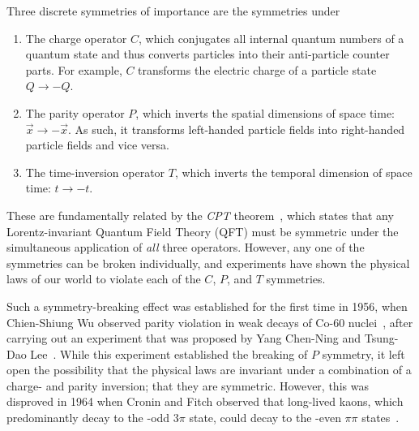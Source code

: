 Three discrete symmetries of importance are the symmetries under 
\begin{enumerate}
    \item The charge operator $C$, which conjugates all internal quantum numbers of a quantum state and thus converts particles into their anti-particle counter parts. For example, $C$ transforms the electric charge of a particle state $Q\to-Q$.
    \item The parity operator $P$, which inverts the spatial dimensions of space time: $\vec x \to -\vec x$. As such, it transforms left-handed particle fields into right-handed particle fields and vice versa.
    \item The time-inversion operator $T$, which inverts the temporal dimension of space time: $t\to -t$.
\end{enumerate}
These are fundamentally related by the \emph{CPT} theorem~\cite{ludersEquivalenceInvarianceTime1954}, which states that any Lorentz-invariant Quantum Field Theory (QFT) must be symmetric under the simultaneous application of \emph{all} three operators. However, any one of the symmetries can be broken individually, and experiments have shown the physical laws of our world to violate each of the $C$, $P$, and $T$ symmetries. 

Such a symmetry-breaking effect was established for the first time in 1956, when Chien-Shiung Wu observed parity violation in weak decays of Co-60 nuclei~\cite{wuExperimentalTestParity1957}, after carrying out an experiment that was proposed by Yang Chen-Ning and Tsung-Dao Lee~\cite{leeQuestionParityConservation1956}. While this experiment established the breaking of $P$ symmetry, it left open the possibility that the physical laws are invariant under a combination of a charge- and parity inversion; that they are \CP symmetric. However, this was disproved in 1964 when Cronin and Fitch observed that long-lived kaons, which predominantly decay to the \CP-odd $3\pi$ state, could decay to the \CP-even $\pi\pi$ states~\cite{KroninFitch1964}. 

